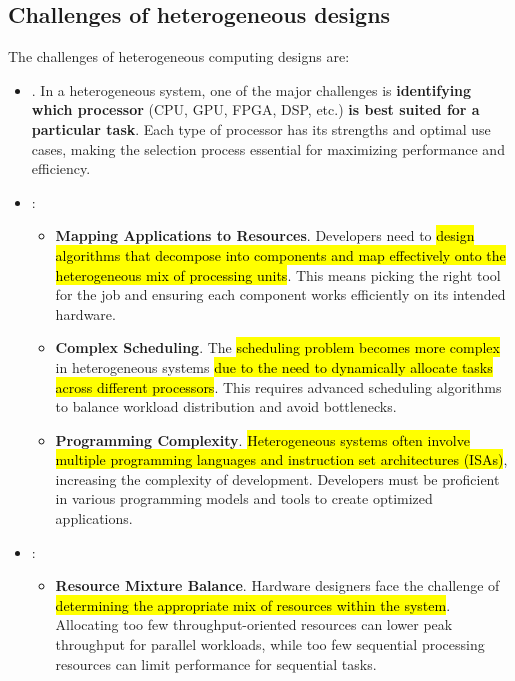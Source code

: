 \subsection{Challenges of heterogeneous designs}

The challenges of heterogeneous computing designs are:
\begin{itemize}
    \item {}. In a heterogeneous system, one of the major challenges is \textbf{identifying which processor} (CPU, GPU, FPGA, DSP, etc.) \textbf{is best suited for a particular task}. Each type of processor has its strengths and optimal use cases, making the selection process essential for maximizing performance and efficiency.

    \item {}:
    \begin{itemize}
        \item \textbf{Mapping Applications to Resources}. Developers need to \hl{design algorithms that decompose into components and map effectively onto the heterogeneous mix of processing units}. This means picking the right tool for the job and ensuring each component works efficiently on its intended hardware.

        \item \textbf{Complex Scheduling}. The \hl{scheduling problem becomes more complex} in heterogeneous systems \hl{due to the need to dynamically allocate tasks across different processors}. This requires advanced scheduling algorithms to balance workload distribution and avoid bottlenecks.
        
        \item \textbf{Programming Complexity}. \hl{Heterogeneous systems often involve multiple programming languages and instruction set architectures (ISAs)}, increasing the complexity of development. Developers must be proficient in various programming models and tools to create optimized applications.
    \end{itemize}

    \item {}:
    \begin{itemize}
        \item \textbf{Resource Mixture Balance}. Hardware designers face the challenge of \hl{determining the appropriate mix of resources within the system}. Allocating too few throughput-oriented resources can lower peak throughput for parallel workloads, while too few sequential processing resources can limit performance for sequential tasks.


\end{itemize}
\end{itemize}
